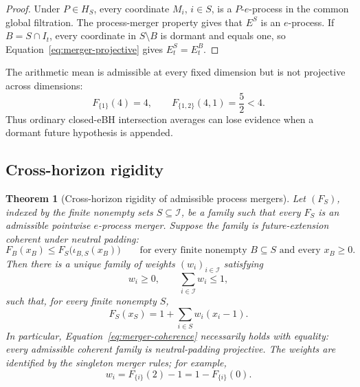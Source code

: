 \documentclass[11pt]{article}
\numberwithin{equation}{section}
\theoremstyle{plain}
\newtheorem{theorem}{Theorem}[section]
\theoremstyle{definition}
\newcommand{\Iuniv}{\mathcal I}
\begin{document}
\begin{proof}
Under $P\in H_S$, every coordinate $M_i$, $i\in S$, is a $P$-$e$-process in the common global filtration. The process-merger property gives that $E^S$ is an $e$-process. If $B=S\cap I_t$, every coordinate in $S\setminus B$ is dormant and equals one, so Equation~\eqref{eq:merger-projective} gives $E_t^S=E_t^B$.
\end{proof}

The arithmetic mean is admissible at every fixed dimension but is not projective across dimensions:
\[
  F_{\{1\}}(4)=4,
  \qquad
  F_{\{1,2\}}(4,1)=\frac52<4.
\]
Thus ordinary closed-eBH intersection averages can lose evidence when a dormant future hypothesis is appended.

\subsection{Cross-horizon rigidity}\label{sec:rigidity}

\begin{theorem}[Cross-horizon rigidity of admissible process mergers]\label{thm:coherent-merger-rigidity}
Let $(F_S)$, indexed by the finite nonempty sets $S\subseteq\Iuniv$, be a family such that every $F_S$ is an admissible pointwise $e$-process merger. Suppose the family is future-extension coherent under neutral padding:
\begin{equation}\label{eq:merger-coherence}
  F_B(x_B)\leq F_S\bigl(\iota_{B,S}(x_B)\bigr)
  \qquad\text{for every finite nonempty }B\subseteq S\text{ and every }x_B\geq0.
\end{equation}
Then there is a unique family of weights $(w_i)_{i\in\Iuniv}$ satisfying
\begin{equation}\label{eq:global-weight-budget}
  w_i\geq0,\qquad \sum_{i\in\Iuniv}w_i\leq1,
\end{equation}
such that, for every finite nonempty $S$,
\begin{equation}\label{eq:affine-projective}
  F_S(x_S)=1+\sum_{i\in S}w_i(x_i-1).
\end{equation}
In particular, Equation~\eqref{eq:merger-coherence} necessarily holds with equality: every admissible coherent family is neutral-padding projective. The weights are identified by the singleton merger rules; for example,
\begin{equation}\label{eq:recover-weights}
  w_i=F_{\{i\}}(2)-1=1-F_{\{i\}}(0).
\end{equation}
\end{theorem}
\end{document}

